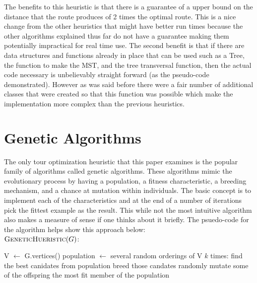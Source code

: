 \documentclass[midd]{thesis}
\newcommand{\tab}{\hspace*{2em}}
\begin{document}
\tab The benefits to this heuristic is that there is a guarantee of a upper bound on the distance that the route produces of 2 times the optimal route. This is a nice change from the other heuristics that might have better run times because the other algorithms explained thus far do not have a guarantee making them potentially impractical for real time use. The second benefit is that if there are data structures and functions already in place that can be used such as a Tree, the function to make the MST, and the tree transversal function, then the actual code necessary is unbelievably straight forward (as the pseudo-code demonstrated). However as was said before there were a fair number of additional classes that were created so that this function was possible which make the implementation more complex than the previous heuristics.

\section{Genetic Algorithms}
\tab The only tour optimization heuristic that this paper examines is the popular family of algorithms called genetic algorithms. These algorithms mimic the evolutionary process by having a population, a fitness characteristic, a breeding mechanism, and a chance at mutation within individuals. The basic concept is to implement each of the characteristics and at the end of a number of iterations pick the fittest example as the result. This while not the most intuitive algorithm also makes a measure of sense if one thinks about it briefly. The psuedo-code for the algorithm helps show this approach below:\\
$\textnormal{\scshape GeneticHueristic}(G)$:
\begin{codebox}
\li V $\gets$ G.vertices()
\li population $\gets$ several random orderings of V
\li \For $k$ times:
\li find the best canidates from population
\li breed those candates
\li randomly mutate some of the offspring \End
\li \Return the most fit member of the population
\end{codebox}
\end{document}
